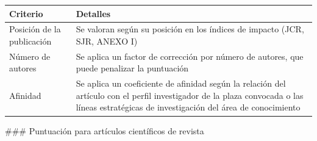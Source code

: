\documentclass{article}
\begin{document}
\begin{itemize}
\begin{itemize}
                        \vspace{0.4cm}
                        \begin{table}[h!]\centering\renewcommand{\arraystretch}{1.3}
                              \begin{tabular}{|p{}|p{}|}\hline
                                    Criterio                   & Detalles                                                                                                                                                                                 \\\hline
                                    Posición de la publicación & Se valoran según su posición en los índices de impacto (JCR, SJR, ANEXO I)                                                                                                               \\\hline
                                    Número de autores          & Se aplica un factor de corrección por número de autores, que puede penalizar la puntuación                                                                                               \\\hline
                                    Afinidad                   & Se aplica un coeficiente de afinidad según la relación del artículo con el perfil investigador de la plaza convocada o las líneas estratégicas de investigación del área de conocimiento \\\hline
                              \end{tabular}\end{table}
                        \vspace{0.4cm}

                        \#\#\# Puntuación para artículos científicos de revista


\end{itemize}
\end{itemize}
\end{document}
